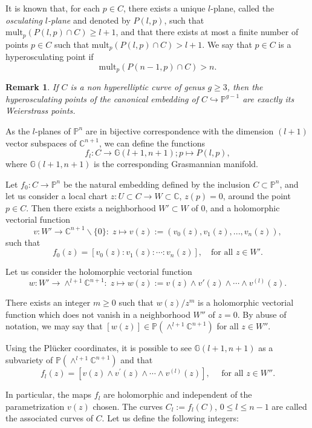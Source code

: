 \documentclass{amsart}
\newcommand{\G}[2]{\ensuremath{\mathbb{G}(#1, #2)}}
\newcommand{\mult}[2]{\ensuremath{\mathrm{mult_{\mathit{p}}}(#1\cap #2)}}
\newcommand{\osc}[2]{\ensuremath{\mathit{P}(#1, #2)}}
\newtheorem{remark}[theorem]{Remark}
\begin{document}
It is known that, for each $p \in C$, there exists a unique $l$-plane, called the {\it osculating $l$-plane} and denoted by $\osc{l}{p}$, such that 
$\mult{\osc{l}{p}}{C}\geq l+1$, and that there exists at most a finite number of points $p\in C$ such that
 $\mult{\osc{l}{p}}{C}> l+1$. We say that $p\in C$ is  a hyperosculating point if 
$$\mult{\osc{n-1}{p}}{C}>n.$$

 

\begin{remark}
If $C$ is a non hyperelliptic curve of genus $g \geq 3$, then the hyperosculating points of the canonical embedding 
of $C \hookrightarrow {\mathbb P}^{g-1}$ are exactly its  Weierstrass points.
\end{remark}

As the $l$-planes of ${\mathbb{P}}^n$ are in bijective correspondence with the 
dimension $(l+1)$ vector subspaces of ${\mathbb{C}}^{n+1}$, we can define the functions
$$f_l:C\rightarrow \G{l+1}{n+1}; p\mapsto \osc{l}{p},$$
where $\G{l+1}{n+1}$ is the corresponding Grasmannian manifold.

Let $f_0:C\rightarrow {\mathbb{P}}^n$  be the natural embedding defined by the inclusion  $C\subset {\mathbb{P}}^n$,
and let us consider a  local chart $z:U\subset C \rightarrow W \subset {\mathbb{C}} $, $z(p)=0$, 
around the point $p\in C$. Then there exists a neighborhood $W'\subset W$ of $0$,
and a holomorphic vectorial function 
$$v:W'\rightarrow {\mathbb{C}}^{n+1}\backslash\{0\}:\;z 
\mapsto v(z):=(v_0(z),v_1(z),...,v_n(z)),$$
such that  
$$
f_0(z)=[v_0(z):v_1(z):\cdots:v_n(z)],  \quad \mbox{for all  $z\in W'$.}
$$

Let us consider the holomorphic vectorial function
$$w:W'\rightarrow \wedge^{l+1}{\mathbb{C}}^{n+1}:\; z\mapsto 
w(z):=v(z)\wedge v'(z)\wedge \cdots \wedge v^{(l)}(z).$$


There exists an integer  $m\geq 0$ such that $w(z)/z^{m}$ 
is a holomorphic vectorial function which does not vanish in a neighborhood $W''$ of $z=0$. 
By abuse of notation, we may say that $[w(z)]\in {\mathbb{P}}(\wedge^{l+1}{\mathbb{C}}^{n+1})$ for all  $z\in W''$.

Using the Pl\"ucker coordinates, it is possible to see $\G{l+1}{n+1}$ as a subvariety of
${\mathbb{P}}(\wedge^{l+1}{\mathbb{C}}^{n+1})$ and that
$$
f_l(z)=[v(z)\wedge v^{'}(z)\wedge \cdots \wedge v^{(l)}(z) ], \quad \mbox{ for all $z\in W''$}.
$$


In particular, the  maps $f_l$ are holomorphic and independent of the parametrization $v(z)$ chosen.
The curves  $C_l:=f_l(C)$, $0\leq l\leq n-1$  are called the  associated curves of $C$. 
Let us define the following integers:
\end{document}
